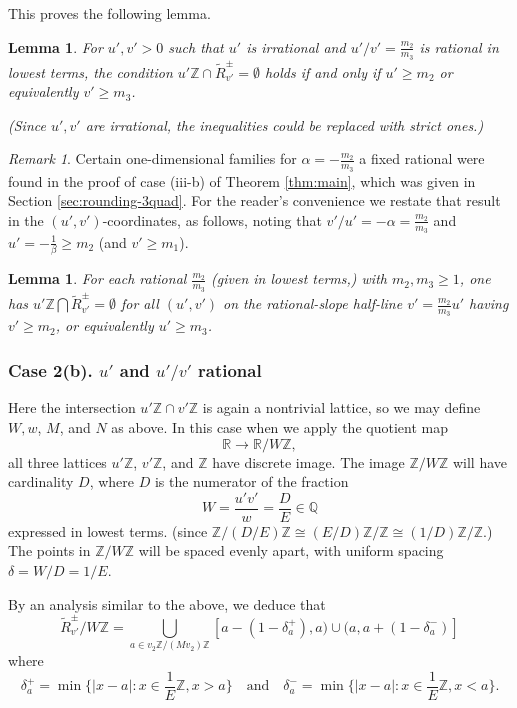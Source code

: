 \documentclass[12pt,letterpaper, reqno]{amsart}
\newtheorem{lem}[thm]{Lemma}
\theoremstyle{definition}
\theoremstyle{remark}
\newtheorem{rmk}[thm]{Remark}
\newcommand{\RR}{\ensuremath{\mathbb{R}}}
\newcommand{\ZZ}{\ensuremath{\mathbb{Z}}}
\newcommand{\QQ}{\mathbb{Q}}
\newcommand{\uu}{{u'}}
\newcommand{\vv}{{v'}}
\newcommand{\ww}{w}
\DeclareMathOperator{\lcm}{lcm}
\begin{document}
This proves the following lemma.

\begin{lem}\label{lem:59}
For $\uu,\vv>0$ such that $\uu$ is irrational and $\uu/\vv = \frac{m_2}{m_3}$ is rational in lowest terms, the condition $\uu\ZZ \cap \widetilde{R}^\pm_\vv = \emptyset$ holds if and only if $\uu \geq m_2$ or equivalently $\vv\geq m_3$.

(Since $\uu,\vv$ are irrational, the inequalities could be replaced with strict ones.)
\end{lem}

\begin{rmk}
Certain  one-dimensional families for $\alpha= -\frac{m_2}{m_3}$ a fixed rational
were found in the proof of case (iii-b) of Theorem \ref{thm:main}, which was given in Section \ref{sec:rounding-3quad}.
For the reader's convenience we  restate that result in the $(\uu, \vv)$-coordinates, as follows, noting that $\vv/\uu= -{\alpha}= \frac{m_2}{m_3} $
 and $\uu = -\frac1{\beta} \geq m_2 $ (and $\vv \geq m_1$).
\end{rmk}

\begin{lem}
For each rational $\frac{m_2}{m_3}$  (given in lowest terms,) with $m_2, m_3 \ge 1$, 
one has  ${\uu}\ZZ \bigcap \widetilde{R}_\vv^{\pm} = \emptyset$
for all $(\uu,\vv)$ on the rational-slope half-line $\vv = \frac{m_2}{m_3}\uu$ having $ \vv \geq {m_2}$, or equivalently ${\uu} \geq m_3 $. 
\end{lem}

\subsubsection{Case 2(b). $\uu$ and $\uu/\vv$ rational}
Here the intersection $\uu\ZZ\cap \vv\ZZ$ is again a nontrivial lattice, so we may define $W, \ww$, $M$, and $N$ as above. 
In this case when we apply the quotient map
\[ \RR \to \RR/W\ZZ,\]
all three lattices $\uu\ZZ$, $\vv\ZZ$, and $\ZZ$ have discrete image.
The image $\ZZ/W\ZZ$ will have cardinality $D$, where $D$ is the numerator of the fraction
\[ W = \frac{\uu\vv}{\ww} = \frac{D}{E} \in \QQ\]
expressed in lowest terms. (since $\ZZ/(D/E)\ZZ \cong (E/D)\ZZ/\ZZ \cong (1/D)\ZZ/\ZZ$.)
The points in $\ZZ/W \ZZ$ will be spaced evenly apart, with uniform spacing $\delta = W/D = 1/E$.

By an analysis similar to the above, we deduce that
\[ \widetilde{R}_{\vv}^\pm / W\ZZ = \bigcup_{a\in v_2\ZZ/(Mv_2)\ZZ} [a-(1-\delta_a^+),a)\cup(a,a+(1-\delta_a^-)]\]
where 
\[\delta_a^+ = \min\{|x-a| : x\in \frac1E\ZZ, x>a \} \quad\text{and}\quad \delta_a^- = \min\{|x-a| : x\in \frac1E\ZZ, x<a\}.\]
\end{document}
